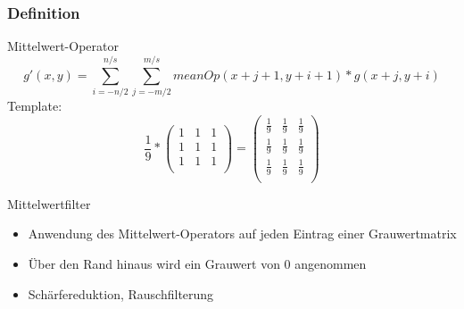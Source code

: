 \documentclass[aspectratio=169]{beamer}
\begin{document}
\begin{frame}
    \frametitle{Definition}
    \begin{center}
    \begin{alertblock}
        {Mittelwert-Operator}
        \begin{equation}
            g'(x,y)=\sum_{i=-n/2}^{n/s}\sum_{j=-m/2}^{m/s}meanOp(x+j+1,y+i+1)*g(x+j,y+i)
        \end{equation}
        Template:
        \begin{equation}
            \frac{1}{9} *
            \begin{pmatrix}
                1 & 1 & 1 \\
                1 & 1 & 1 \\
                1 & 1 & 1 \\
            \end{pmatrix}
            =
            \begin{pmatrix}
                \frac{1}{9} & \frac{1}{9} & \frac{1}{9} \\
                \frac{1}{9} & \frac{1}{9} & \frac{1}{9} \\
                \frac{1}{9} & \frac{1}{9} & \frac{1}{9} \\
            \end{pmatrix}
        \end{equation}
    \end{alertblock}
    \begin{alertblock}
        {Mittelwertfilter}
        \begin{itemize}
            \item Anwendung des Mittelwert-Operators auf jeden Eintrag einer Grauwertmatrix
            \item Über den Rand hinaus wird ein Grauwert von 0 angenommen
            \item Schärfereduktion, Rauschfilterung
        \end{itemize}
    \end{alertblock}
    \end{center}
\end{frame}
\end{document}
